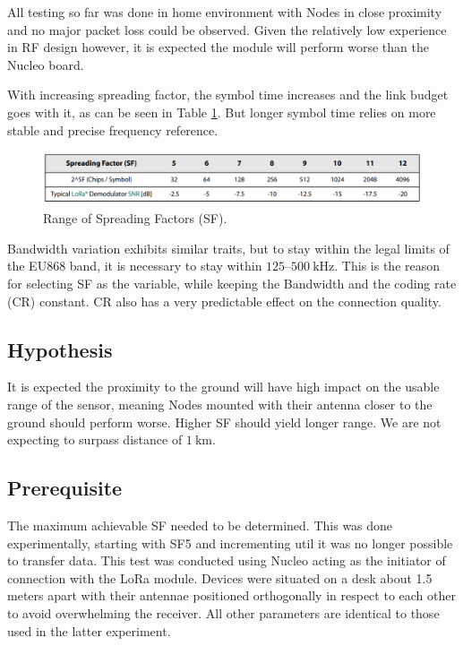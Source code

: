 All testing so far was done in home environment with Nodes in close proximity and no major packet loss could be observed. Given the relatively low experience in RF design however, it is expected the module will perform worse than the Nucleo board.

With increasing spreading factor, the symbol time increases and the link budget goes with it, as can be seen in Table \ref{table:semtech-sf}. But longer symbol time relies on more stable and precise frequency reference. 

\begin{figure}[H]
    \includegraphics[width=\textwidth]{fig/semtech-sf-table.png}
    \caption{\label{table:semtech-sf}Range of Spreading Factors (SF).}
\end{figure}

Bandwidth variation exhibits similar traits, but to stay within the legal limits of the EU868 band, it is necessary to stay within $125\text{--}500~\mathrm{kHz}$. This is the reason for selecting SF as the variable, while keeping the Bandwidth and the coding rate (CR) constant. CR also has a very predictable effect on the connection quality.

\subsection{Hypothesis}
It is expected the proximity to the ground will have high impact on the usable range of the sensor, meaning Nodes mounted with their antenna closer to the ground should perform worse. Higher SF should yield longer range. We are not expecting to surpass distance of $1~\mathrm{km}$.

\subsection{\label{section:range-prerequisite}Prerequisite}
The maximum achievable SF needed to be determined. This was done experimentally, starting with SF5 and incrementing util it was no longer possible to transfer data. This test was conducted using Nucleo acting as the initiator of connection with the LoRa module. Devices were situated on a desk about 1.5 meters apart with their antennae positioned orthogonally in respect to each other to avoid overwhelming the receiver. All other parameters are identical to those used in the latter experiment.

